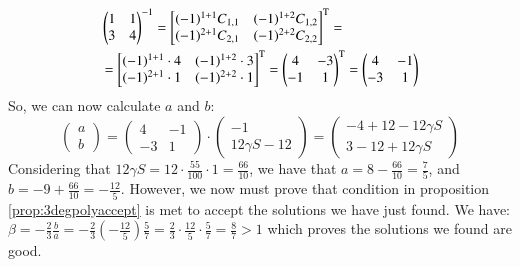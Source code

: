 \begin{align*}
&
\begin{pmatrix}
1 & 1 \\
3 & 4
\end{pmatrix}^{-1}
=
\begin{bmatrix}
(-1)^{1+1}C_{1,1} & (-1)^{1+2}C_{1,2} \\
(-1)^{2+1}C_{2,1} & (-1)^{2+2}C_{2,2}
\end{bmatrix}^\text{T}
= \notag\\
&=\begin{bmatrix}
(-1)^{1+1} \cdot 4 & (-1)^{1+2} \cdot 3 \\
(-1)^{2+1} \cdot 1 & (-1)^{2+2} \cdot 1
\end{bmatrix}^\text{T}
=
\begin{pmatrix}
4 & -3 \\
-1 & 1
\end{pmatrix}^\text{T}
=
\begin{pmatrix}
4 & -1 \\
-3 & 1
\end{pmatrix}
\end{align*}
So, we can now calculate $a$ and $b$:
\begin{equation*}
\begin{pmatrix}
a \\
b
\end{pmatrix}
=
\begin{pmatrix}
4 & -1 \\
-3 & 1
\end{pmatrix}
\cdot
\begin{pmatrix}
-1 \\
12 \gamma S - 12
\end{pmatrix}
=
\begin{pmatrix}
-4 +12 -12 \gamma S \\
3 - 12 + 12 \gamma S
\end{pmatrix}
\end{equation*}
Considering that $12 \gamma S = 12 \cdot \frac{55}{100} \cdot 1 = \frac{66}{10}$,
we have that $a = 8 - \frac{66}{10} = \frac{7}{5}$, and 
$b = -9 + \frac{66}{10} = -\frac{12}{5}$.
However, we now must prove that condition in proposition \ref{prop:3degpolyaccept}
is met to accept the solutions we have just found. We have: 
$\beta = -\frac{2}{3}\frac{b}{a} = -\frac{2}{3}\left(-\frac{12}{5}\right)\frac{5}{7} = 
 \frac{2}{3}\cdot\frac{12}{5}\cdot\frac{5}{7} = \frac{8}{7} > 1$ which proves
the solutions we found are good.

